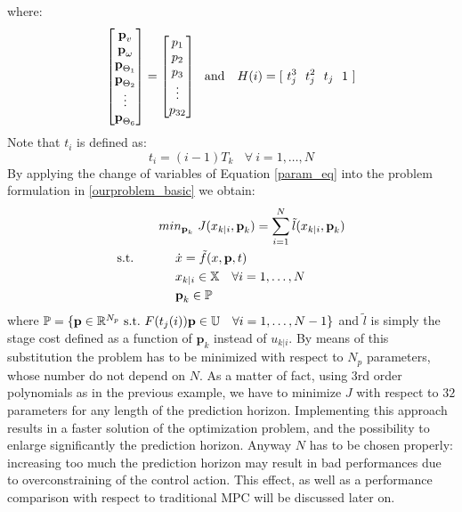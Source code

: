 where: 
\begin{equation}
\left[ \begin{matrix} \textbf{p}_v \\ \textbf{p}_{\omega} \\ \textbf{p}_{\Theta_1} \\ \textbf{p}_{\Theta_2} \\ \vdots \\ \textbf{p}_{\Theta_6} \end{matrix} \right] = \left[ \begin{matrix} p_1 \\ p_2 \\ p_3 \\ \vdots \\ p_{32} \end{matrix} \right]\ \ \textnormal{and }\ \ H(i)=[\ t_j^3\ \ t_j^2\ \ t_j\ \ 1\ ]
\end{equation}
Note that $t_i$  is defined as:
\begin{equation*}
	t_i=(i-1)T_k\ \ \ \ \forall\ i=1,\dots,N
\end{equation*}
By applying the change of variables of Equation \ref{param_eq} into the problem formulation in \ref{ourproblem_basic} we obtain:
\begin{equation} \label{ourproblem_param}
\begin{split}
		& min_{\textbf{p}_k}\ J({x}_{k|i},\textbf{p}_k) = \sum_{i=1}^{N}\tilde{l}({x}_{k|i},\textbf{p}_k) \\
		\textnormal{s.t.}\qquad
		&\ \ \ \ \dot{{x}}=\tilde{f}({x},\textbf{p},t) \\
		&\ \ \ \ {x}_{k|i} \in \mathbb{X}\quad \forall i=1,\dots, N  \\
		&\ \ \ \ \textbf{p}_k   \in \mathbb{P}\ \\
	\end{split}	
\end{equation}
where $\mathbb{P} = \lbrace \textbf{p}\in \mathbb{R}^{N_p}\ \textnormal{s.t.}\ F(t_j(i))\textbf{p} \in \mathbb{U}\quad \forall i = 1, \dots, N-1 \rbrace $ and $\tilde{l}$ is simply the stage cost defined as a function of $\textbf{p}_k$ instead of ${u}_{k|i}$. By means of this substitution the problem has to be minimized with respect to $N_p$ parameters, whose number do not depend on $N$. As a matter of fact, using 3rd order polynomials as in the previous example, we have to minimize $J$ with respect to $32$ parameters for any length of the prediction horizon. Implementing this approach results in a faster solution of the optimization problem, and the possibility to enlarge significantly the prediction horizon. Anyway $N$ has to be chosen properly: increasing too much the prediction horizon may result in bad performances due to overconstraining of the control action. This effect, as well as a performance comparison with respect to traditional MPC will be discussed later on.

